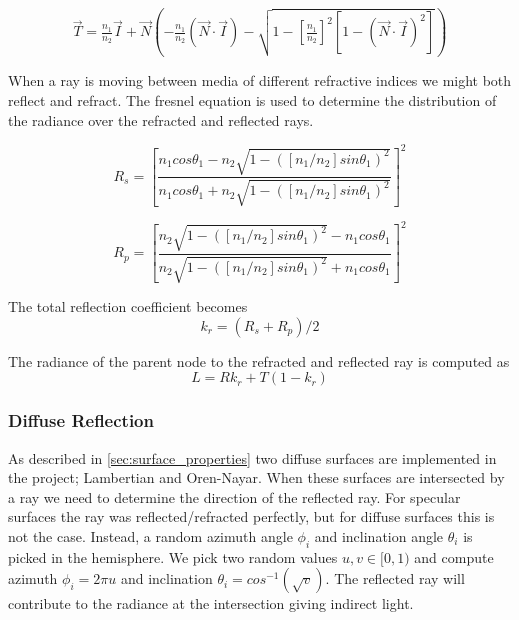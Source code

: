 \documentclass[a4paper, twocolumn]{article}
\begin{document}
            \small
            \begin{equation*}
              \vec{T} = \tfrac{n_1}{n_2}\vec{I} + \vec{N}\left(-\tfrac{n_1}{n_2}(\vec{N}\cdot\vec{I}) - \sqrt{1 - [\tfrac{n_1}{n_2}]^2[1 - (\vec{N}\cdot\vec{I})^2]}\right)
            \end{equation*}
            \normalsize

            When a ray is moving between media of different refractive indices we might both reflect and refract. The fresnel equation is used to determine the distribution of the radiance over the refracted and reflected rays.

            \begin{equation*}
            R_s = \left[\frac{n_1cos\theta_1 - n_2\sqrt{1-([n_1/n_2]sin\theta_1)^2}}{n_1cos\theta_1 + n_2\sqrt{1-([n_1/n_2]sin\theta_1)^2}}\right]^2
          \end{equation*}

          \begin{equation*}
            R_p = \left[\frac{n_2\sqrt{1-([n_1/n_2]sin\theta_1)^2} - n_1cos\theta_1}{n_2\sqrt{1-([n_1/n_2]sin\theta_1)^2} + n_1cos\theta_1}\right]^2
          \end{equation*}

          The total reflection coefficient becomes
          \begin{equation*}
            k_r = (R_s + R_p)/2
          \end{equation*}

          The radiance of the parent node to the refracted and reflected ray is computed as
          \begin{equation*}
            L = R k_r + T (1-k_r)
          \end{equation*}

          \subsubsection{Diffuse Reflection} \label{sec:diffuse_refraction}
          As described in \ref{sec:surface_properties} two diffuse surfaces are implemented in the project; Lambertian and Oren-Nayar. When these surfaces are intersected by a ray we need to determine the direction of the reflected ray. For specular surfaces the ray was reflected/refracted perfectly, but for diffuse surfaces this is not the case. Instead, a random azimuth angle $\phi_i$ and inclination angle $\theta_i$ is picked in the hemisphere. We pick two random values $u, v \in [0,1)$ and compute azimuth $\phi_i = 2\pi u$ and inclination $\theta_i = cos^{-1}(\sqrt{v})$. The reflected ray will contribute to the radiance at the intersection giving indirect light.
\end{document}
